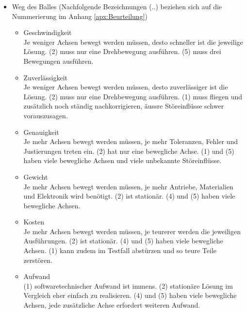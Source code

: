 \begin{itemize}
			\item Weg des Balles (Nachfolgende Bezeichnungen (..) beziehen sich auf die Nummerierung im Anhang \ref{apx:Beurteilung})			
				\begin{itemize}
					\item Geschwindigkeit\\
					Je weniger Achsen bewegt werden müssen, desto schneller ist die jeweilige Lösung. (2) muss nur eine Drehbewegung ausführen. (5) muss drei Bewegungen ausführen.
					\item Zuverlässigkeit\\
					Je weniger Achsen bewegt werden müssen, desto zuverlässiger ist die Lösung. (2) muss nur eine Drehbewegung ausführen. (1) muss fliegen und zusätzlich noch ständig nachkorrigieren, äussre Störeinflüsse schwer vorauszusagen.
					\item Genauigkeit\\
					Je mehr Achsen bewegt werden müssen, je mehr Toleranzen, Fehler und Justierungen treten ein. (2) hat nur eine bewegliche Achse. (1) und (5) haben viele bewegliche Achsen und viele unbekannte Störeinflüsse.
					\item Gewicht\\
					Je mehr Achsen bewegt werden müssen, je mehr Antriebe, Materialien und Elektronik wird benötigt. (2) ist stationär. (4) und (5) haben viele bewegliche Achsen. 
					\item Kosten\\
					Je mehr Achsen bewegt werden müssen, je teurerer werden die jeweiligen Ausführungen. (2) ist stationär. (4) und (5) haben viele bewegliche Achsen. (1) kann zudem im Testfall abstürzen und so teure Teile zerstören.
					\item Aufwand\\
					(1) softwaretechnischer Aufwand ist immens. (2) stationäre Lösung im Vergleich eher einfach zu realisieren. (4) und (5) haben viele bewegliche Achsen, jede zusätzliche Achse erfordert weiteren Aufwand.	
				\end{itemize}
		\end{itemize}

